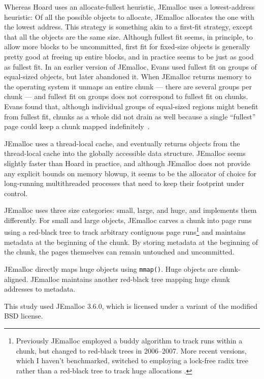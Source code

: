 \documentclass[natbib,sort&compress,10pt]{sigplanconf}
\newcommand{\code}[1]{\texttt{#1}}
\begin{document}
Whereas Hoard uses an allocate-fullest heuristic, JEmalloc uses a
lowest-address heuristic: Of all the possible objects to allocate,
JEmalloc allocates the one with the lowest address.  This strategy is
something akin to a first-fit strategy, except that all the objects
are the same size.  Although fullest fit seems, in principle, to allow
more blocks to be uncommitted, first fit for fixed-size objects is
generally pretty good at freeing up entire blocks, and in practice
seems to be just as good as fullest fit.  In an earlier version of
JEmalloc, Evans used fullest fit on groups of equal-sized objects, but
later abandoned it.  When JEmalloc returns memory to the operating
system it unmaps an entire chunk --- there are several groups per
chunk --- and fullest fit on groups does not correspond to fullest fit
on chunks. Evans found that, although individual groups of equal-sized
regions might benefit from fullest fit, chunks as a whole did not
drain as well because a single ``fullest'' page could keep a chunk
mapped indefinitely~\cite{Evans15-personal-communication}.  

JEmalloc uses a thread-local cache, and eventually returns objects
from the thread-local cache into the globally accessible data
structure.  JEmalloc seems slightly faster than Hoard in practice, and
although JEmalloc does not provide any explicit bounds on memory
blowup, it seems to be the allocator of choice for long-running
multithreaded processes that need to keep their footprint under
control.

JEmalloc uses three size categories: small, large, and huge, and
implements them differently. For small and large objects, JEmalloc
carves a chunk into page runs using a red-black tree to track
arbitrary contiguous page runs\footnote{Previously JEmalloc employed a
  buddy algorithm to track runs within a chunk, but changed to
  red-black trees in 2006--2007.  More recent versions, which I
  haven't benchmarked, switched to employing a lock-free radix tree
  rather than a red-black tree to track huge allocations
  \cite{Evans15-personal-communication}.} and maintains metadata at
the beginning of the chunk.  By storing metadata at the beginning of
the chunk, the pages themselves can remain untouched and uncommitted.

JEmalloc directly maps huge objects using \code{mmap()}.  Huge objects
are chunk-aligned.  JEmalloc maintains another red-black tree mapping
huge chunk addresses to metadata.

This study used JEmalloc 3.6.0, which is licensed under a variant of the
modified BSD license.
\end{document}

